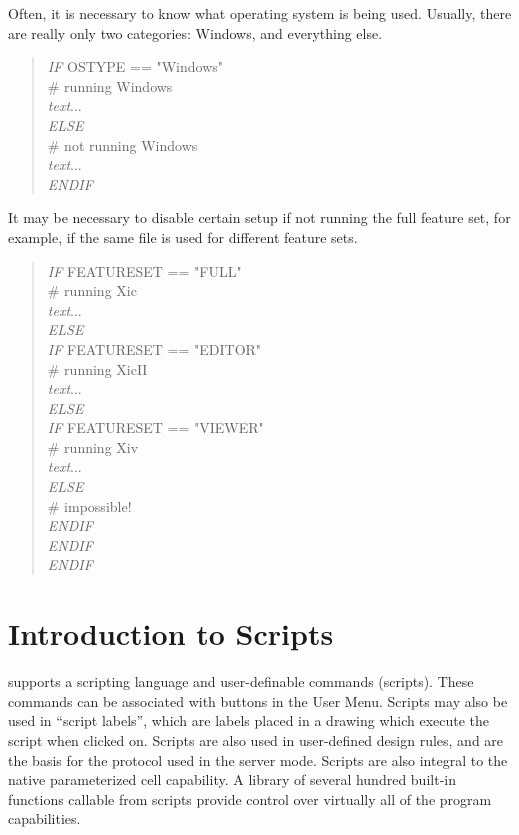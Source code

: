 Often, it is necessary to know what operating system is being used. 
Usually, there are really only two categories:  Windows, and
everything else.

\begin{quote}
{\it IF} {\vt OSTYPE == "Windows"}\\
\# running Windows\\
{\it text\/}...\\
{\it ELSE}\\
\# not running Windows\\
{\it text\/}...\\
{\it ENDIF}\\
\end{quote}

It may be necessary to disable certain setup if not running the full
{\Xic} feature set, for example, if the same file is used for
different {\Xic} feature sets.

\begin{quote}
{\it IF} {\vt FEATURESET == "FULL"}\\
\# running Xic\\
{\it text\/}...\\
{\it ELSE}\\
{\it IF} {\vt FEATURESET == "EDITOR"}\\
\# running XicII\\
{\it text\/}...\\
{\it ELSE}\\
{\it IF} {\vt FEATURESET == "VIEWER"}\\
\# running Xiv\\
{\it text\/}...\\
{\it ELSE}\\
\# impossible!\\
{\it ENDIF}\\
{\it ENDIF}\\
{\it ENDIF}\\
\end{quote}


\section{Introduction to {\Xic} Scripts}
\label{scriptintro}

{\Xic} supports a scripting language and user-definable commands
(scripts).  These commands can be associated with buttons in the {\cb
User Menu}.  Scripts may also be used in ``script labels'', which are
labels placed in a drawing which execute the script when clicked on. 
Scripts are also used in user-defined design rules, and are the basis
for the protocol used in the {\Xic} server mode.  Scripts are also
integral to the native parameterized cell capability.  A library of
several hundred built-in functions callable from scripts provide
control over virtually all of the program capabilities.

